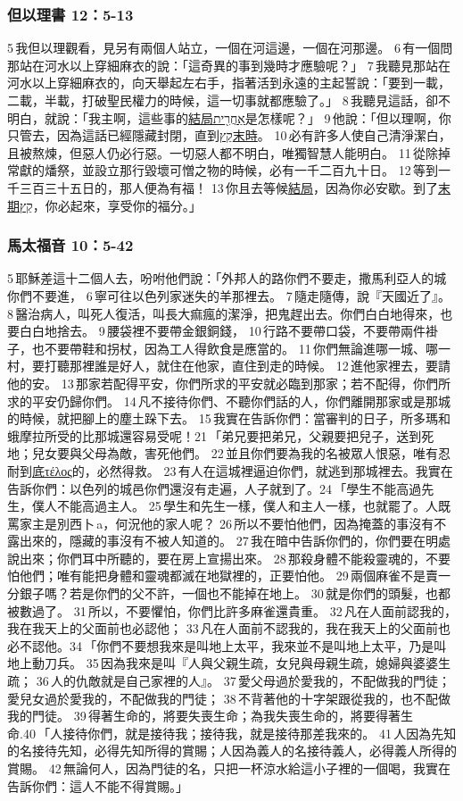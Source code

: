 \subsubsection{但以理書 12：5-13}
5 我但以理觀看，見另有兩個人站立，一個在河這邊，一個在河那邊。 6 有一個問那站在河水以上穿細麻衣的說：「這奇異的事到幾時才應驗呢？」 7 我聽見那站在河水以上穿細麻衣的，向天舉起左右手，指著活到永遠的主起誓說：「要到一載，二載，半載，打破聖民權力的時候，這一切事就都應驗了。」 8 我聽見這話，卻不明白，就說：「我主啊，這些事的\underline{結局אַחֲרִ֖ית}是怎樣呢？」 9 他說：「但以理啊，你只管去，因為這話已經隱藏封閉，直到\underline{קֵץ末時}。 10 必有許多人使自己清淨潔白，且被熬煉，但惡人仍必行惡。一切惡人都不明白，唯獨智慧人能明白。 11 從除掉常獻的燔祭，並設立那行毀壞可憎之物的時候，必有一千二百九十日。 12 等到一千三百三十五日的，那人便為有福！ 13 你且去等候\underline{結局}，因為你必安歇。到了\underline{末期קֵץ}，你必起來，享受你的福分。」

\subsubsection{馬太福音 10：5-42}
5 耶穌差這十二個人去，吩咐他們說：「外邦人的路你們不要走，撒馬利亞人的城你們不要進， 6 寧可往以色列家迷失的羊那裡去。 7 隨走隨傳，說『天國近了』。 8 醫治病人，叫死人復活，叫長大痲瘋的潔淨，把鬼趕出去。你們白白地得來，也要白白地捨去。 9 腰袋裡不要帶金銀銅錢， 10 行路不要帶口袋，不要帶兩件褂子，也不要帶鞋和拐杖，因為工人得飲食是應當的。 11 你們無論進哪一城、哪一村，要打聽那裡誰是好人，就住在他家，直住到走的時候。 12 進他家裡去，要請他的安。 13 那家若配得平安，你們所求的平安就必臨到那家；若不配得，你們所求的平安仍歸你們。 14 凡不接待你們、不聽你們話的人，你們離開那家或是那城的時候，就把腳上的塵土跺下去。 15 我實在告訴你們：當審判的日子，所多瑪和蛾摩拉所受的比那城還容易受呢！21 「弟兄要把弟兄，父親要把兒子，送到死地；兒女要與父母為敵，害死他們。 22 並且你們要為我的名被眾人恨惡，唯有忍耐到\underline{底τέλος}的，必然得救。 23 有人在這城裡逼迫你們，就逃到那城裡去。我實在告訴你們：以色列的城邑你們還沒有走遍，人子就到了。24 「學生不能高過先生，僕人不能高過主人。 25 學生和先生一樣，僕人和主人一樣，也就罷了。人既罵家主是別西卜 a，何況他的家人呢？ 26 所以不要怕他們，因為掩蓋的事沒有不露出來的，隱藏的事沒有不被人知道的。 27 我在暗中告訴你們的，你們要在明處說出來；你們耳中所聽的，要在房上宣揚出來。 28 那殺身體不能殺靈魂的，不要怕他們；唯有能把身體和靈魂都滅在地獄裡的，正要怕他。 29 兩個麻雀不是賣一分銀子嗎？若是你們的父不許，一個也不能掉在地上。 30 就是你們的頭髮，也都被數過了。 31 所以，不要懼怕，你們比許多麻雀還貴重。 32 凡在人面前認我的，我在我天上的父面前也必認他； 33 凡在人面前不認我的，我在我天上的父面前也必不認他。34 「你們不要想我來是叫地上太平，我來並不是叫地上太平，乃是叫地上動刀兵。 35 因為我來是叫『人與父親生疏，女兒與母親生疏，媳婦與婆婆生疏； 36 人的仇敵就是自己家裡的人』。 37 愛父母過於愛我的，不配做我的門徒；愛兒女過於愛我的，不配做我的門徒； 38 不背著他的十字架跟從我的，也不配做我的門徒。 39 得著生命的，將要失喪生命；為我失喪生命的，將要得著生命.40 「人接待你們，就是接待我；接待我，就是接待那差我來的。 41 人因為先知的名接待先知，必得先知所得的賞賜；人因為義人的名接待義人，必得義人所得的賞賜。 42 無論何人，因為門徒的名，只把一杯涼水給這小子裡的一個喝，我實在告訴你們：這人不能不得賞賜。」

